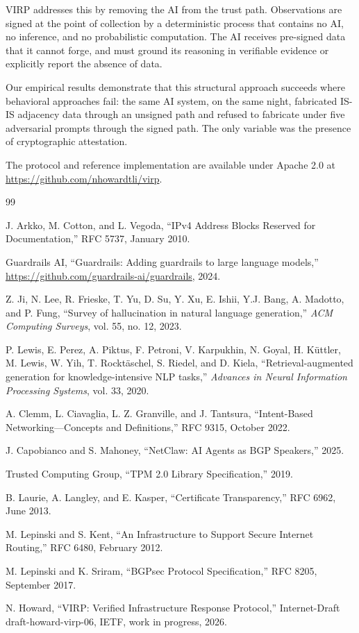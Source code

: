 \documentclass[11pt,twocolumn]{article}
\begin{document}
VIRP addresses this by removing the AI from the trust path. Observations are signed at the point of collection by a deterministic process that contains no AI, no inference, and no probabilistic computation. The AI receives pre-signed data that it cannot forge, and must ground its reasoning in verifiable evidence or explicitly report the absence of data.

Our empirical results demonstrate that this structural approach succeeds where behavioral approaches fail: the same AI system, on the same night, fabricated IS-IS adjacency data through an unsigned path and refused to fabricate under five adversarial prompts through the signed path. The only variable was the presence of cryptographic attestation.

The protocol and reference implementation are available under Apache 2.0 at \url{https://github.com/nhowardtli/virp}.

\begin{thebibliography}{99}

J. Arkko, M. Cotton, and L. Vegoda,
``IPv4 Address Blocks Reserved for Documentation,''
RFC 5737, January 2010.

Guardrails AI,
``Guardrails: Adding guardrails to large language models,''
\url{https://github.com/guardrails-ai/guardrails}, 2024.

Z. Ji, N. Lee, R. Frieske, T. Yu, D. Su, Y. Xu, E. Ishii, Y.J. Bang, A. Madotto, and P. Fung,
``Survey of hallucination in natural language generation,''
\textit{ACM Computing Surveys}, vol. 55, no. 12, 2023.

P. Lewis, E. Perez, A. Piktus, F. Petroni, V. Karpukhin, N. Goyal, H. K\"{u}ttler, M. Lewis, W. Yih, T. Rockt\"{a}schel, S. Riedel, and D. Kiela,
``Retrieval-augmented generation for knowledge-intensive NLP tasks,''
\textit{Advances in Neural Information Processing Systems}, vol. 33, 2020.

A. Clemm, L. Ciavaglia, L. Z. Granville, and J. Tantsura,
``Intent-Based Networking---Concepts and Definitions,''
RFC 9315, October 2022.

J. Capobianco and S. Mahoney,
``NetClaw: AI Agents as BGP Speakers,''
2025.

Trusted Computing Group,
``TPM 2.0 Library Specification,''
2019.

B. Laurie, A. Langley, and E. Kasper,
``Certificate Transparency,''
RFC 6962, June 2013.

M. Lepinski and S. Kent,
``An Infrastructure to Support Secure Internet Routing,''
RFC 6480, February 2012.

M. Lepinski and K. Sriram,
``BGPsec Protocol Specification,''
RFC 8205, September 2017.

N. Howard,
``VIRP: Verified Infrastructure Response Protocol,''
Internet-Draft draft-howard-virp-06, IETF, work in progress, 2026.

\end{thebibliography}
\end{document}
